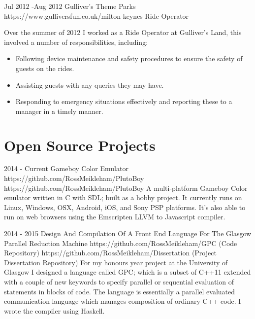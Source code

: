 \documentclass[10pt]{article} %
\begin{document}
\job
{Jul 2012 -}{Aug 2012}
{Gulliver's Theme Parks}
{https://www.gulliversfun.co.uk/milton-keynes}
{Ride Operator}
{Over the summer of 2012 I worked as a Ride Operator at Gulliver's Land, this involved a number of responsibilities, including: 
\begin{itemize}[noitemsep]
\item{Following device maintenance and safety procedures to ensure the safety of guests on the rides.}
\item{Assisting guests with any queries they may have.}
\item{Responding to emergency situations effectively and reporting these to a manager in a timely manner.}
\end{itemize}
}



\section{Open Source Projects}
\job
{2014 - }{Current}
{Gameboy Color Emulator}
{https://github.com/RossMeikleham/PlutoBoy}
{https://github.com/RossMeikleham/PlutoBoy}
{A multi-platform Gameboy Color emulator written in C with SDL; built as a hobby project. 
It currently runs on Linux, Windows, OSX, Android, iOS, and Sony PSP platforms. 
It's also able to run on web browsers using the Emscripten LLVM to Javascript compiler.} 


\jobtwo
{2014 - }{2015}
{Design And Compilation Of A Front End Language For The Glasgow Parallel Reduction Machine}
{}
{https://github.com/RossMeikleham/GPC (Code Repository)}
{https://github.com/RossMeikleham/Dissertation (Project Dissertation Repository)}
{For my honours year project at the University of Glasgow I designed a language called GPC; which is a subset of C++11 extended with a couple of new keywords to specify parallel or sequential evaluation of statements in blocks of code. The language is essentially a parallel evaluated communication language which manages composition of ordinary C++ code. I wrote the compiler using Haskell.}



\end{document}
